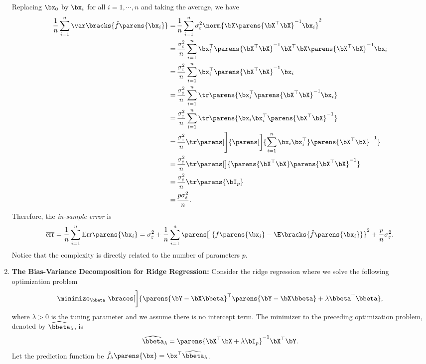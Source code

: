 \documentclass[12pt]{article}
\begin{document}
\begin{enumerate}[label=\textbf{\arabic*.}]
	Replacing $\bx_0$ by $\bx_i$ for all $i = 1, \cdots, n$ and taking the average, we have 
	\begin{align*}
		\frac{1}{n} \sum_{i=1}^n \var \bracks{\hat{f} \parens{\bx_i}} = & \, \frac{1}{n} \sum_{i=1}^{n} \sigma_{\varepsilon}^2 \norm{\bX \parens{\bX^\top \bX}^{-1} \bx_i}^2 \\ 
		= & \, \frac{\sigma_{\varepsilon}^2}{n} \sum_{i=1}^n \bx_i^\top \parens{\bX^\top \bX}^{-1} \bX^\top \bX \parens{\bX^\top \bX}^{-1} \bx_i \\ 
		= & \, \frac{\sigma_{\varepsilon}^2}{n} \sum_{i=1}^n \bx_i^\top \parens{\bX^\top \bX}^{-1} \bx_i \\ 
		= & \, \frac{\sigma_{\varepsilon}^2}{n} \sum_{i=1}^n \tr \parens{ \bx_i^\top \parens{\bX^\top \bX}^{-1} \bx_i} \\ 
		= & \, \frac{\sigma_{\varepsilon}^2}{n} \sum_{i=1}^n \tr \parens{ \bx_i \bx_i^\top \parens{\bX^\top \bX}^{-1}} \\ 
		= & \, \frac{\sigma_{\varepsilon}^2}{n} \tr \parens[\Bigg]{\parens[\bigg]{\sum_{i=1}^n \bx_i \bx_i^\top} \parens{\bX^\top \bX}^{-1}} \\ 
		= & \, \frac{\sigma_{\varepsilon}^2}{n} \tr \parens[\big]{\parens{\bX^\top \bX} \parens{\bX^\top \bX}^{-1}} \\ 
		= & \, \frac{\sigma_{\varepsilon}^2}{n} \tr \parens{\bI_p} \\ 
		= & \, \frac{p \sigma_{\varepsilon}^2}{n}. 
	\end{align*}
	Therefore, the \textit{in-sample error} is 
	\begin{align*}
		\overline{\mathrm{err}} = \frac{1}{n} \sum_{i=1}^n \mathrm{Err} \parens{\bx_i} = \sigma_{\varepsilon}^2 + \frac{1}{n} \sum_{i=1}^n \parens[\big]{ f \parens{\bx_i} - \E \bracks{ \hat{f} \parens{\bx_i} } }^2 + \frac{p}{n} \sigma_{\varepsilon}^2. 
	\end{align*}
	Notice that the complexity is directly related to the number of parameters $p$. 
	
	\item \textbf{The Bias-Variance Decomposition for Ridge Regression:} Consider the ridge regression where we solve the following optimization problem 
	\begin{align*}
		\minimize_{\bbeta} \ \braces[\bigg]{ \parens{\bY - \bX \bbeta}^\top \parens{\bY - \bX \bbeta} + \lambda \bbeta^\top \bbeta }, 
	\end{align*}
	where $\lambda > 0$ is the tuning parameter and we assume there is no intercept term. The minimizer to the preceding optimization problem, denoted by $\widehat{\bbeta}_{\lambda}$, is 
	\begin{align*}
		\widehat{\bbeta}_{\lambda} = \parens{\bX^\top \bX + \lambda \bI_p}^{-1} \bX^\top \bY. 
	\end{align*}
	Let the prediction function be $\hat{f}_{\lambda} \parens{\bx} = \bx^\top \widehat{\bbeta}_{\lambda}$. 
	

\end{enumerate}
\end{document}
